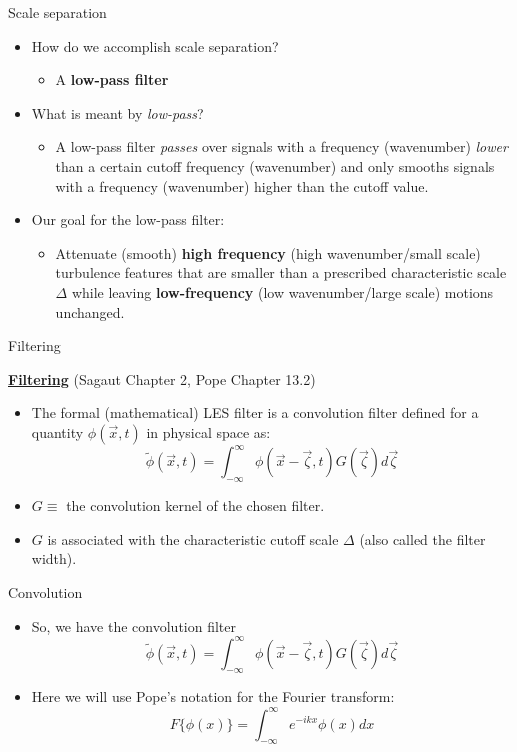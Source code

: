 \begin{frame}{Scale separation}

\begin{itemize}
	\item How do we accomplish scale separation?
	\begin{itemize}
		\item A \textbf{low-pass filter}
	\end{itemize}
	\item What is meant by \textit{low-pass}?
	\begin{itemize}
		\item A low-pass filter \textit{passes} over signals with a frequency (wavenumber) \textit{lower} than a certain cutoff frequency (wavenumber) and only smooths signals with a frequency (wavenumber) higher than the cutoff value.
	\end{itemize}
	\item Our goal for the low-pass filter:
	\begin{itemize}
		\item Attenuate (smooth) \textbf{high frequency} (high wavenumber/small scale) turbulence features that are smaller than a prescribed characteristic scale $\Delta$ while leaving \textbf{low-frequency} (low wavenumber/large scale) motions unchanged. 
	\end{itemize}
\end{itemize}
\end{frame}

\begin{frame}{Filtering}

\textbf{\underline{Filtering}} (Sagaut Chapter 2, Pope Chapter 13.2)
\begin{itemize}
	\item The formal (mathematical) LES filter is a convolution filter defined for a quantity $\phi (\vec{x},t)$ in physical space as:
	$$\tilde \phi (\vec{x},t) = \int_{-\infty}^{\infty} \phi (\vec{x} - \vec{\zeta},t) G(\vec{\zeta}) d \vec{\zeta}$$
	\item $G \equiv$ the convolution kernel of the chosen filter.
	\item $G$ is associated with the characteristic cutoff scale $\Delta$ (also called the filter width).
\end{itemize}
\end{frame}

\begin{frame}{Convolution}

\begin{itemize}
	\item So, we have the convolution filter 
	$$\tilde \phi (\vec{x},t) = \int_{-\infty}^{\infty} \phi (\vec{x} - \vec{\zeta},t) G(\vec{\zeta}) d \vec{\zeta}$$
	\item Here we will use Pope's notation for the Fourier transform:
	$$F\{\phi(x)\} = \int_{-\infty}^{\infty} e^{-ikx}\phi(x)dx$$
\end{itemize}
\end{frame}

